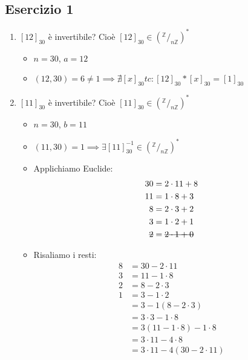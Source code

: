 \documentclass[10pt]{article}
\begin{document}
	\subsection{Esercizio 1}
	\begin{enumerate}
	\item
	$\left[12\right]_{30}$ è invertibile? Cioè $\displaystyle{\left[12\right]_{30} \in \left(^\mathbb{Z}/_{n \mathbb{Z}}\right)^*}$
	\begin{itemize}
	\item
	$n=30$, $a=12$
	\item
	$\displaystyle{(12,30) = 6 \neq 1 \implies \nexists \left[x\right]_{30} tc: \left[12\right]_{30} * \left[x\right]_{30} = \left[1\right]_{30}}$
	\end{itemize}
	\item
	$\left[11\right]_{30}$ è invertibile? Cioè $\displaystyle{\left[11\right]_{30} \in \left(^\mathbb{Z}/_{n \mathbb{Z}}\right)^*}$
	\begin{itemize}
	\item
	$n=30$, $b=11$
	\item
	$\displaystyle{(11,30) = 1 \implies \exists \left[11\right]_{30}^{-1} \in \left(^\mathbb{Z}/_{n \mathbb{Z}}\right)^*}$
	\item
	Applichiamo Euclide:
	\begin{equation}
	\begin{split}
	30 &= 2 \cdot 11 + 8 \\
	11 &= 1 \cdot 8 + 3 \\
	8 &= 2 \cdot 3 + 2 \\
	3 &= 1 \cdot 2 + 1 \\
	\hbox{\sout{$2$}} &= \hbox{\sout{$2 \cdot 1 + 0$}}
	\notag
	\end{split}
	\end{equation}
	\item
	Risaliamo i resti:
	\begin{equation}
	\begin{split}
	8 &= 30 - 2 \cdot 11 \\
	3 &= 11 - 1 \cdot 8 \\
	2 &= 8 - 2 \cdot 3 \\
	1 &= 3 - 1 \cdot 2 \\
	&= 3 - 1(8 - 2 \cdot 3) \\
	&= 3 \cdot 3 - 1 \cdot 8 \\
	&= 3(11 - 1 \cdot 8) - 1 \cdot 8 \\
	&= 3 \cdot 11 - 4 \cdot 8 \\
	&= 3 \cdot 11 - 4(30 - 2 \cdot 11) \\

\end{split}
\end{equation}
\end{itemize}
\end{enumerate}
\end{document}

